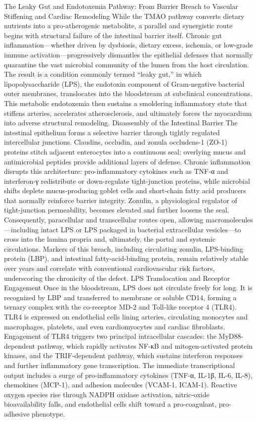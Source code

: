 The Leaky Gut and Endotoxemia Pathway: From Barrier Breach to Vascular Stiffening and Cardiac Remodeling
While the TMAO pathway converts dietary nutrients into a pro-atherogenic metabolite, a parallel and synergistic route begins with structural failure of the intestinal barrier itself. Chronic gut inflammation—whether driven by dysbiosis, dietary excess, ischemia, or low-grade immune activation—progressively dismantles the epithelial defenses that normally quarantine the vast microbial community of the lumen from the host circulation. The result is a condition commonly termed “leaky gut,” in which lipopolysaccharide (LPS), the endotoxin component of Gram-negative bacterial outer membranes, translocates into the bloodstream at subclinical concentrations. This metabolic endotoxemia then sustains a smoldering inflammatory state that stiffens arteries, accelerates atherosclerosis, and ultimately forces the myocardium into adverse structural remodeling.
Disassembly of the Intestinal Barrier
The intestinal epithelium forms a selective barrier through tightly regulated intercellular junctions. Claudins, occludin, and zonula occludens-1 (ZO-1) proteins stitch adjacent enterocytes into a continuous seal; overlying mucus and antimicrobial peptides provide additional layers of defense. Chronic inflammation disrupts this architecture: pro-inflammatory cytokines such as TNF-α and interferon-γ redistribute or down-regulate tight-junction proteins, while microbial shifts deplete mucus-producing goblet cells and short-chain fatty acid producers that normally reinforce barrier integrity. Zonulin, a physiological regulator of tight-junction permeability, becomes elevated and further loosens the seal. Consequently, paracellular and transcellular routes open, allowing macromolecules—including intact LPS or LPS packaged in bacterial extracellular vesicles—to cross into the lamina propria and, ultimately, the portal and systemic circulations. Markers of this breach, including circulating zonulin, LPS-binding protein (LBP), and intestinal fatty-acid-binding protein, remain relatively stable over years and correlate with conventional cardiovascular risk factors, underscoring the chronicity of the defect.
LPS Translocation and Receptor Engagement
Once in the bloodstream, LPS does not circulate freely for long. It is recognized by LBP and transferred to membrane or soluble CD14, forming a ternary complex with the co-receptor MD-2 and Toll-like receptor 4 (TLR4). TLR4 is expressed on endothelial cells lining arteries, circulating monocytes and macrophages, platelets, and even cardiomyocytes and cardiac fibroblasts. Engagement of TLR4 triggers two principal intracellular cascades: the MyD88-dependent pathway, which rapidly activates NF-κB and mitogen-activated protein kinases, and the TRIF-dependent pathway, which sustains interferon responses and further inflammatory gene transcription. The immediate transcriptional output includes a surge of pro-inflammatory cytokines (TNF-α, IL-1β, IL-6, IL-8), chemokines (MCP-1), and adhesion molecules (VCAM-1, ICAM-1). Reactive oxygen species rise through NADPH oxidase activation, nitric-oxide bioavailability falls, and endothelial cells shift toward a pro-coagulant, pro-adhesive phenotype.
